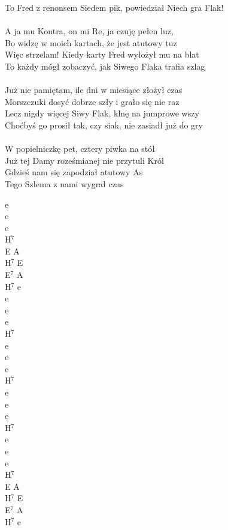 \documentclass[a5paper, 10pt]{book}
\begin{document}
\begin{minipage}[t]{0.85\textwidth}
  To Fred z renonsem Siedem pik, powiedział Niech gra Flak!\\
  \\
  A ja mu Kontra, on mi Re, ja czuję pełen luz,\\
  Bo widzę w moich kartach, że jest atutowy tuz\\
  Więc strzelam! Kiedy karty Fred wyłożył mu na blat\\
  To każdy mógł zobaczyć, jak Siwego Flaka trafia szlag\\
  \\
  Już nie pamiętam, ile dni w miesiące złożył czas\\
  Morszczuki dosyć dobrze szły i grało się nie raz\\
  Lecz nigdy więcej Siwy Flak, klnę na jumprowe wszy\\
  Choćbyś go prosił tak, czy siak, nie zasiadł już do gry\\
  \\
  \hspace*{5mm}W popielniczkę pet, cztery piwka na stół\\
  \hspace*{5mm}Już tej Damy roześmianej nie przytuli Król\\
  \hspace*{5mm}Gdzieś nam się zapodział atutowy As\\
  \hspace*{5mm}Tego Szlema z nami wygrał czas\\
\end{minipage}
\begin{minipage}[t]{0.15\textwidth}
  e\\e\\e\\H$^7$\\

  E A\\
  H$^7$ E\\
  E$^7$ A\\
  H$^7$ e\\

  e\\e\\e\\H$^7$\\

  e\\e\\e\\H$^7$\\

  e\\e\\e\\H$^7$\\

  e\\e\\e\\H$^7$\\

  E A\\
  H$^7$ E\\
  E$^7$ A\\
  H$^7$ e\\

\end{minipage}
\end{document}
